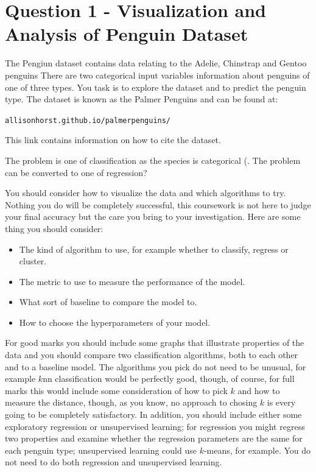 \documentclass[12pt]{article}
\begin{document}
\section*{Question 1 - Visualization and Analysis of Penguin Dataset}

The Pengiun dataset \cite{PM} contains data relating to the Adelie, Chinstrap and Gentoo penguins
There are two categorical input variables
information about penguins of one of three types. You task is to
explore the dataset and to predict the penguin type. The dataset is
known as the Palmer Penguins and can be found at:

\texttt{allisonhorst.github.io/palmerpenguins/}

This link contains information on how to cite the dataset.


The problem is one of classification as the species is categorical (. 
The problem can be converted to one of regression?


You should consider how to visualize the data and which algorithms to
try. Nothing you do will be completely successful, this coursework is
not here to judge your final accuracy but the care you bring to your
investigation. Here are some thing you should consider:
\begin{itemize}
  \item The kind of algorithm to use, for example whether to classify, regress  or cluster.
  \item The metric to use to measure the performance of the model.
  \item What sort of baseline to compare the model to.
  \item How to choose the hyperparameters of your model.
\end{itemize}
For good marks you should include some graphs that illustrate
properties of the data and you should compare two classification
algorithms, both to each other and to a baseline model. The algorithms
you pick do not need to be unusual, for example $k$nn classification
would be perfectly good, though, of course, for full marks this would
include some consideration of how to pick $k$ and how to measure the
distance, though, as you know, no approach to chosing $k$ is every
going to be completely satisfactory. In addition, you should include
either some exploratory regression or unsupervised learning; for
regression you might regress two properties and examine whether the
regression parameters are the same for each penguin type; unsupervised
learning could use $k$-means, for example. You do not need to do both
regression and unsupervised learning.
\end{document}
